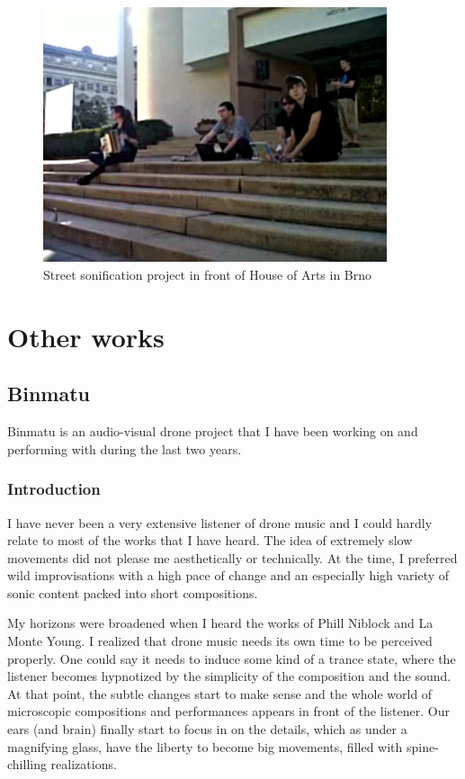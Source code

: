 \documentclass[12pt,a4paper,oneside]{report}
\begin{document}
\begin{figure}  
  \centering
    \includegraphics[width=0.9\textwidth]{img/workshop}
        \caption{Street sonification project in front of House of Arts in Brno}
        \label{fig:workshop}
\end{figure}


\chapter{Other works} 

\section{Binmatu} Binmatu is an audio-visual drone project that I have been working on and performing with during the last two years.

\subsection{Introduction}

I have never been a very extensive listener of drone music and I could hardly relate to most of the works that I have heard. The idea of extremely slow movements did not please me aesthetically or technically. At the time, I preferred wild improvisations with a high pace of change and an especially high variety of sonic content packed into short compositions.

My horizons were broadened when I heard the works of Phill Niblock and La Monte Young. I realized that drone music needs its own time to be perceived properly. One could say it needs to induce some kind of a trance state, where the listener becomes hypnotized by the simplicity of the composition and the sound. At that point, the subtle changes start to make sense and the whole world of microscopic compositions and performances appears in front of the listener. Our ears (and brain) finally start to focus in on the details, which as under a magnifying glass, have the liberty to become big movements, filled with spine-chilling realizations.
\end{document}
